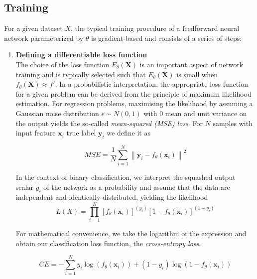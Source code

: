\documentclass[bsc,frontabs,twoside,singlespacing,parskip,deptreport]{infthesis}     %
\begin{document}
\subsection{Training}
For a given dataset \(X\), the typical training procedure of a feedforward neural network parameterized by \(\theta\) is gradient-based and consists of a series of steps: \\
\begin{enumerate}
    \item{ \bf{Defining a differentiable loss function}} \vspace{0.2cm} \\
    The choice of the loss function \(E_{\theta}(\mathbf{X})\) is an important aspect of network training and is typically selected such that \(E_{\theta}(\mathbf{X})\) is small when \(f_{\theta}(\mathbf{X}) \approx f'\). In a probabilistic interpretation, the appropriate loss function for a given problem can be derived from the principle of maximum likelihood estimation. For regression problems, maximising the likelihood by assuming a Gaussian noise distribution \(\epsilon\sim N(0,1)\) with 0 mean and unit variance on the output yields the so-called \textit{mean-squared (MSE) loss}. For \(N\) samples with input feature \(\mathbf{x}_{i}\) true label \(\mathbf{y}_{i}\) we define it as
    
\begin{equation}
MSE=\frac{1}{N} \sum_{i=1}^{N}\left\|\mathbf{y}_{i}-f_{\theta}(\mathbf{x}_{i}) \right\|^{2}
\end{equation}

In the context of binary classification, we interpret the squashed output scalar \({y}_{i}\) of the network as a probability and assume that the data are independent and identically distributed, yielding the likelihood
\begin{equation}
L(X)=\prod_{i=1}^{N}\left[f_{\theta}\left(\mathbf{x}_{i}\right)\right]^{\left({y}_{i}\right)}\left[1-f_{\theta}\left(\mathbf{x}_{i}\right)\right]^{\left(1-{y}_{i}\right)}
\end{equation}
    
For mathematical convenience, we take the logarithm of the expression and obtain our classification loss function, the \textit{cross-entropy loss}.

\begin{equation}
CE = -\sum_{i=1}^{N} y_{i} \log \left(f_{\theta}\left(\mathbf{x}_{i}\right)\right)+\left(1-y_{i}\right) \log \left(1-f_{\theta}\left(\mathbf{x}_{i}\right)\right)
\end{equation}


\end{enumerate}
\end{document}
